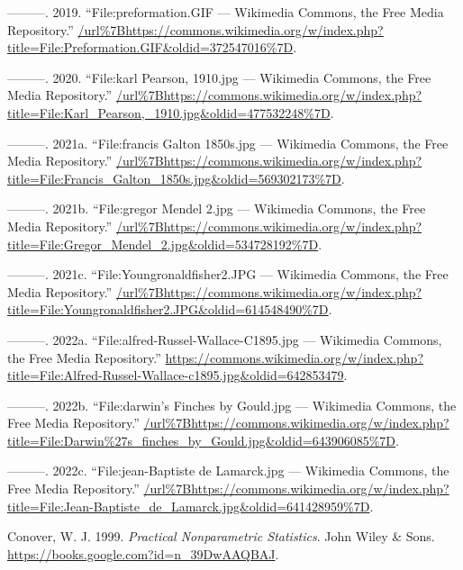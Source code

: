 \documentclass[
]{book}
\newlength{\cslhangindent}
\newlength{\cslentryspacingunit} %
\newenvironment{CSLReferences}[2] %
 {%
  \setlength{\parindent}{0pt}
  \ifodd #1
  \let\oldpar\par
  \def\par{\hangindent=\cslhangindent\oldpar}
  \fi
  \setlength{\parskip}{#2\cslentryspacingunit}
 }%
 {}
\begin{document}
\begin{CSLReferences}{1}{0}
\leavevmode{}%
---------. 2019. {``File:preformation.GIF --- Wikimedia Commons{,} the Free Media Repository.''} \url{/url\%7Bhttps://commons.wikimedia.org/w/index.php?title=File:Preformation.GIF\&oldid=372547016\%7D}.

\leavevmode{}%
---------. 2020. {``File:karl Pearson, 1910.jpg --- Wikimedia Commons{,} the Free Media Repository.''} \url{/url\%7Bhttps://commons.wikimedia.org/w/index.php?title=File:Karl_Pearson,_1910.jpg\&oldid=477532248\%7D}.

\leavevmode{}%
---------. 2021a. {``File:francis Galton 1850s.jpg --- Wikimedia Commons{,} the Free Media Repository.''} \url{/url\%7Bhttps://commons.wikimedia.org/w/index.php?title=File:Francis_Galton_1850s.jpg\&oldid=569302173\%7D}.

\leavevmode{}%
---------. 2021b. {``File:gregor Mendel 2.jpg --- Wikimedia Commons{,} the Free Media Repository.''} \url{/url\%7Bhttps://commons.wikimedia.org/w/index.php?title=File:Gregor_Mendel_2.jpg\&oldid=534728192\%7D}.

\leavevmode{}%
---------. 2021c. {``File:Youngronaldfisher2.JPG --- Wikimedia Commons{,} the Free Media Repository.''} \url{/url\%7Bhttps://commons.wikimedia.org/w/index.php?title=File:Youngronaldfisher2.JPG\&oldid=614548490\%7D}.

\leavevmode{}%
---------. 2022a. {``File:alfred-Russel-Wallace-C1895.jpg --- Wikimedia Commons{,} the Free Media Repository.''} \url{https://commons.wikimedia.org/w/index.php?title=File:Alfred-Russel-Wallace-c1895.jpg\&oldid=642853479}.

\leavevmode{}%
---------. 2022b. {``File:darwin's Finches by Gould.jpg --- Wikimedia Commons{,} the Free Media Repository.''} \url{/url\%7Bhttps://commons.wikimedia.org/w/index.php?title=File:Darwin\%27s_finches_by_Gould.jpg\&oldid=643906085\%7D}.

\leavevmode{}%
---------. 2022c. {``File:jean-Baptiste de Lamarck.jpg --- Wikimedia Commons{,} the Free Media Repository.''} \url{/url\%7Bhttps://commons.wikimedia.org/w/index.php?title=File:Jean-Baptiste_de_Lamarck.jpg\&oldid=641428959\%7D}.

\leavevmode{}%
Conover, W. J. 1999. \emph{Practical {Nonparametric Statistics}}. {John Wiley \& Sons}. \url{https://books.google.com?id=n_39DwAAQBAJ}.


\end{CSLReferences}
\end{document}
